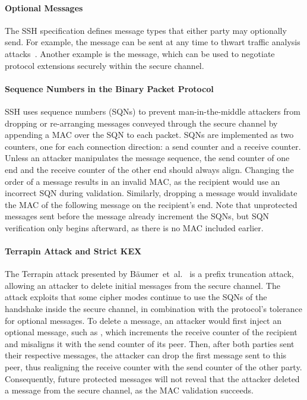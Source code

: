 \paragraph{Optional Messages} 

The SSH specification defines message types that either party may optionally send. For example, the \msgignore message can be sent at any time to thwart traffic analysis attacks~\cite{USENIX:SonWagTia01}. Another example is the \msgextinfo message, which can be used to negotiate protocol extensions securely within the secure channel.

\paragraph{Sequence Numbers in the Binary Packet Protocol} 

SSH uses sequence numbers (SQNs) to prevent man-in-the-middle attackers from dropping or re-arranging messages conveyed through the secure channel by appending a MAC over the SQN to each packet. SQNs are implemented as two counters, one for each connection direction: a send counter and a receive counter. Unless an attacker manipulates the message sequence, the send counter of one end and the receive counter of the other end should always align. Changing the order of a message results in an invalid MAC, as the recipient would use an incorrect SQN during validation. Similarly, dropping a message would invalidate the MAC of the following message on the recipient's end. Note that unprotected messages sent before the \msgnewkeys message already increment the SQNs, but SQN verification only begins afterward, as there is no MAC included earlier.

\paragraph{Terrapin Attack and Strict KEX} 

The Terrapin attack presented by Bäumer~et~al.~\cite{USENIX:BauBriSch24} is a prefix truncation attack, allowing an attacker to delete initial messages from the secure channel. The attack exploits that some cipher modes continue to use the SQNs of the handshake inside the secure channel, in combination with the protocol's tolerance for optional messages. To delete a message, an attacker would first inject an optional message, such as \msgignore, which increments the receive counter of the recipient and misaligns it with the send counter of its peer. Then, after both parties sent their respective \msgnewkeys messages, the attacker can drop the first message sent to this peer, thus realigning the receive counter with the send counter of the other party. Consequently, future protected messages will not reveal that the attacker deleted a message from the secure channel, as the MAC validation succeeds.

